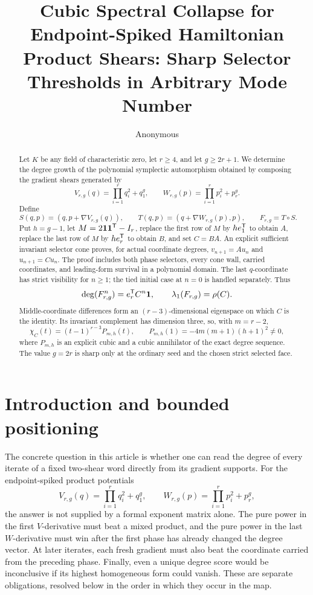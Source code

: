\documentclass[11pt]{article}
\title{Cubic Spectral Collapse for Endpoint-Spiked Hamiltonian Product Shears: Sharp Selector Thresholds in Arbitrary Mode Number}
\author{Anonymous}
\date{}
\theoremstyle{remark}
\numberwithin{equation}{section}
\begin{document}
\maketitle

\begin{abstract}
Let \(K\) be any field of characteristic zero, let \(r\geq4\), and let
\(g\geq2r+1\).  We determine the degree growth of the polynomial symplectic
automorphism obtained by composing the gradient shears generated by
\[
V_{r,g}(q)=\prod_{i=1}^{r}q_i^2+q_1^g,
\qquad
W_{r,g}(p)=\prod_{i=1}^{r}p_i^2+p_r^g.
\]
Define
\[
S(q,p)=(q,p+\nabla V_{r,g}(q)),\qquad
T(q,p)=(q+\nabla W_{r,g}(p),p),\qquad
F_{r,g}=T\circ S.
\]
Put \(h=g-1\), let \(M=2\mathbf{1}\mathbf{1}^{\mathsf{T}}-I_r\), replace the first row
of \(M\) by \(he_1^{\mathsf{T}}\) to obtain \(A\), replace the last row of
\(M\) by \(he_r^{\mathsf{T}}\) to obtain \(B\), and set \(C=BA\).  An explicit
sufficient invariant selector cone proves, for actual coordinate degrees,
\(v_{n+1}=Au_n\) and \(u_{n+1}=Cu_n\).  The proof includes both phase
selectors, every cone wall, carried coordinates, and leading-form survival
in a polynomial domain.  The last \(q\)-coordinate has strict visibility for
\(n\geq1\); the tied initial case at \(n=0\) is handled separately.  Thus
\[
\operatorname{deg}(F_{r,g}^n)=e_r^{\mathsf{T}}C^n\mathbf{1},
\qquad
\lambda_1(F_{r,g})=\rho(C).
\]
Middle-coordinate differences form an \((r-3)\)-dimensional eigenspace on
which \(C\) is the identity.  Its invariant complement has dimension three,
so, with \(m=r-2\),
\[
\chi_C(t)=(t-1)^{r-3}P_{m,h}(t),
\qquad
P_{m,h}(1)=-4m(m+1)(h+1)^2\neq0,
\]
where \(P_{m,h}\) is an explicit cubic and a cubic annihilator of the exact
degree sequence.  The value \(g=2r\) is sharp only at the ordinary seed and
the chosen strict selected face.
\end{abstract}

\section{Introduction and bounded positioning}\label{sec:introduction}

The concrete question in this article is whether one can read the degree of
every iterate of a fixed two-shear word directly from its gradient supports.
For the endpoint-spiked product potentials
\begin{equation}\label{eq:intro-potentials}
V_{r,g}(q)=\prod_{i=1}^{r}q_i^2+q_1^g,
\qquad
W_{r,g}(p)=\prod_{i=1}^{r}p_i^2+p_r^g,
\end{equation}
the answer is not supplied by a formal exponent matrix alone.  The pure
power in the first \(V\)-derivative must beat a mixed product, and the pure
power in the last \(W\)-derivative must win after the first phase has already
changed the degree vector.  At later iterates, each fresh gradient must also
beat the coordinate carried from the preceding phase.  Finally, even a
unique degree score would be inconclusive if its highest homogeneous form
could vanish.  These are separate obligations, resolved below in the order
in which they occur in the map.
\end{document}
